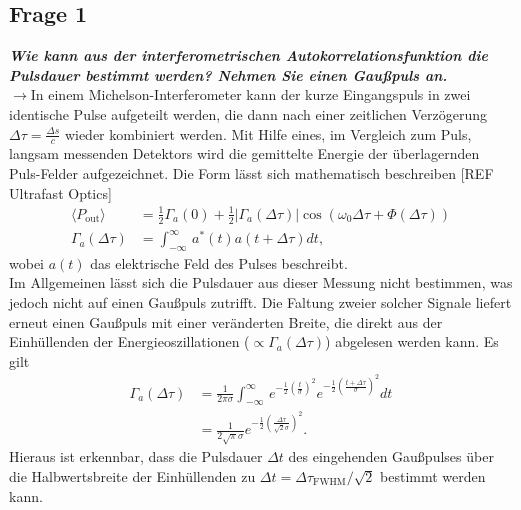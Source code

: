 \subsection{\label{subsec:FZV1}Frage 1}
\textbf{\textit{Wie kann aus der interferometrischen Autokorrelationsfunktion die Pulsdauer 
bestimmt werden? Nehmen Sie einen Gaußpuls an.}}\\
$\rightarrow$In einem Michelson-Interferometer kann der kurze Eingangspuls 
in zwei identische Pulse aufgeteilt werden, die dann nach einer zeitlichen Verzögerung
$\Delta \tau=\frac{\Delta{s}}{c}$ wieder kombiniert werden. Mit Hilfe eines, im Vergleich 
zum Puls, langsam messenden Detektors wird die gemittelte Energie der überlagernden 
Puls-Felder aufgezeichnet. Die Form lässt sich mathematisch beschreiben [REF Ultrafast Optics]
\begin{align}
    \langle P_{\text{out}}\rangle &= \frac{1}{2}\Gamma_{a}(0) + \frac{1}{2}|\Gamma_{a}(\Delta \tau)|\cos(\omega_{0}\Delta\tau + \Phi(\Delta\tau)) \\
    \Gamma_{a}(\Delta \tau) &= \int_{-\infty}^{\infty}\,a^{*}(t)a(t+\Delta \tau) dt,
\end{align}  
wobei $a(t)$ das elektrische Feld des Pulses beschreibt. \\
Im Allgemeinen lässt sich die Pulsdauer aus dieser Messung nicht bestimmen, was jedoch nicht 
auf einen Gaußpuls zutrifft. Die Faltung zweier solcher Signale liefert erneut einen Gaußpuls mit einer
veränderten Breite, die direkt aus der Einhüllenden der Energieoszillationen 
($\propto \Gamma_{a}(\Delta \tau)$) abgelesen werden kann. 
Es gilt 
\begin{align}
    \Gamma_{a}(\Delta \tau) &= \frac{1}{2\pi\sigma}\int_{-\infty}^{\infty}\,e^{-\frac{1}{2}(\frac{t}{\sigma})^{2}}
    e^{-\frac{1}{2}(\frac{t+\Delta \tau}{\sigma})^{2}} dt \\
    &= \frac{1}{2\sqrt{\pi}\sigma}e^{-\frac{1}{2}(\frac{\Delta \tau}{\sqrt{2}\sigma})^{2}}.
\end{align}
Hieraus ist erkennbar, dass die Pulsdauer $\Delta t$ des eingehenden Gaußpulses über die Halbwertsbreite der 
Einhüllenden zu $\Delta t = \Delta \tau_{\text{FWHM}}/\sqrt{2}$ bestimmt werden kann. \\

